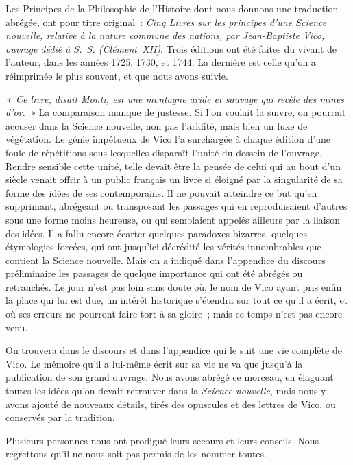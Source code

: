 \documentclass[french,twoside]{book} %
\newcommand{\byline}[1]{\bigskip{\RaggedLeft{#1}\par}\bigskip}
\begin{document}
\byline{}
\noindent  Les Principes de la Philosophie de l’Histoire dont nous donnons une traduction abrégée, ont pour titre original : {\itshape Cinq Livres sur les principes d’une Science nouvelle, relative à la nature commune des nations, par Jean-Baptiste Vico, ouvrage dédié à S. S. (Clément XII)}. Trois éditions ont été faites du vivant de l’auteur, dans les années 1725, 1730, et 1744. La dernière est celle qu’on a réimprimée le plus souvent, et que nous avons suivie.\par
\emph{« Ce livre, disait Monti, est une montagne aride et sauvage qui recèle des mines d’or. »} La comparaison manque de justesse. Si l’on voulait la suivre, on pourrait accuser dans la Science nouvelle, non pas l’aridité, mais bien  un luxe de végétation. Le génie impétueux de Vico l’a surchargée à chaque édition d’une foule de répétitions sous lesquelles disparaît l’unité du dessein de l’ouvrage. Rendre sensible cette unité, telle devait être la pensée de celui qui au bout d’un siècle venait offrir à un public français un livre si éloigné par la singularité de sa forme des idées de ses contemporains. Il ne pouvait atteindre ce but qu’en supprimant, abrégeant ou transposant les passages qui en reproduisaient d’autres sous une forme moins heureuse, ou qui semblaient appelés ailleurs par la liaison des idées. Il a fallu encore écarter quelques paradoxes bizarres, quelques étymologies forcées, qui ont jusqu’ici décrédité les vérités innombrables que contient la Science nouvelle. Mais on a indiqué dans l’appendice du discours préliminaire les passages de quelque importance qui ont été abrégés ou retranchés. Le jour n’est pas loin sans doute où, le nom de Vico ayant pris enfin la place qui lui est due, un intérêt historique s’étendra sur tout ce qu’il a écrit, et où ses  erreurs ne pourront faire tort à sa gloire ; mais ce temps n’est pas encore venu.\par
\par
On trouvera dans le discours et dans l’appendice qui le suit une vie complète de Vico. Le mémoire qu’il a lui-même écrit sur sa vie ne va que jusqu’à la publication de son grand ouvrage. Nous avons abrégé ce morceau, en élaguant toutes les idées qu’on devait retrouver dans la {\itshape Science nouvelle}, mais nous y avons ajouté de nouveaux détails, tirés des opuscules et des lettres de Vico, ou conservés par la tradition.\par
Plusieurs personnes nous ont prodigué leurs secours et leurs conseils. Nous regrettons qu’il ne nous soit pas permis de les nommer toutes.\par
\end{document}
